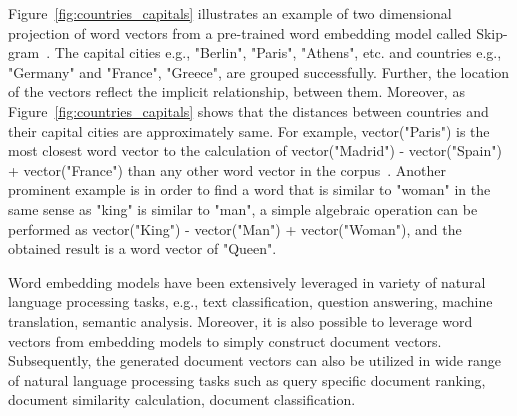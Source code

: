 Figure~\ref{fig:countries_capitals} illustrates an example of two dimensional projection of word vectors from a pre-trained word embedding model called Skip-gram~\cite{DBLP:conf/nips/MikolovSCCD13}. The capital cities e.g., "Berlin", "Paris", "Athens", etc. and countries e.g., "Germany" and "France", "Greece", are grouped successfully. Further, the location of the vectors reflect the implicit relationship, between them. Moreover, as Figure~\ref{fig:countries_capitals} shows that the distances between countries and their capital cities are approximately same. For example, vector("Paris") is the most closest word vector to the calculation of vector("Madrid") - vector("Spain") + vector("France") than any other word vector in the corpus~\cite{DBLP:conf/nips/MikolovSCCD13}. Another prominent example is in order to find  a word that is similar to "woman" in the same sense as "king" is similar to "man", a simple algebraic operation can be performed as vector("King") - vector("Man") + vector("Woman"), and the obtained result is a word vector of "Queen".

Word embedding models have been extensively leveraged in variety of natural language processing tasks, e.g., text classification, question answering, machine translation, semantic analysis. Moreover, it is also possible to leverage word vectors from embedding models to simply construct document vectors. Subsequently, the generated document vectors can also be utilized in wide range of natural language processing tasks such as query specific document ranking, document similarity calculation, document classification.


